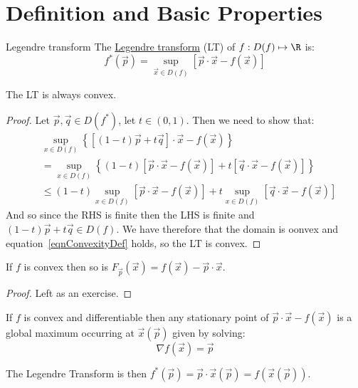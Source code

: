 \documentclass[../Main.tex]{subfiles}
\begin{document}
\section{Definition and Basic Properties}
\begin{definition}{Legendre transform}
    The \underline{Legendre transform} (LT) of $f : D(f) \mapsto \R$ is:
    \begin{equation}
        f^*(\vec{p}) = \sup_{\vec{x} \in D(f)} \left[\vec{p} \cdot \vec{x} - f(\vec{x})\right]
        \label{eqnLT}
    \end{equation}
\end{definition}
\begin{proposition}
    The LT is always convex.
    \label{propLTConvex}
\end{proposition}
\begin{proof}
    Let $\vec{p}, \vec{q} \in D(f^*)$, let $t \in (0, 1)$. Then we need to show that:
    \begin{align*}
        &\sup_{x \in D(f)} \left\{\left[(1 - t)\vec{p} + t\vec{q}\right] \cdot \vec{x} - f(\vec{x})\right\} \\
        &= \sup_{x \in D(f)} \left\{(1-t)\left[\vec{p} \cdot \vec{x} - f(\vec{x})\right] + t \left[\vec{q} \cdot \vec{x} - f(\vec{x})\right]\right\} \\
        &\leq (1-t) \sup_{x \in D(f)} \left[\vec{p} \cdot \vec{x} - f(\vec{x})\right] + t \sup_{x \in D(f)} \left[\vec{q} \cdot \vec{x} - f(\vec{x})\right]
    \end{align*}
    And so since the RHS is finite then the LHS is finite and $(1-t)\vec{p} + t\vec{q} \in D(f)$. We have therefore that the domain is oonvex and equation~\ref{eqnConvexityDef} holds, so the LT is convex.
\end{proof}
\begin{proposition}
    If $f$ is convex then so is $F_{\vec{p}}(\vec{x}) = f(\vec{x}) - \vec{p} \cdot \vec{x}$.
\end{proposition}
\begin{proof}
    Left as an exercise.
\end{proof}
\begin{corollary}
    If $f$ is convex and differentiable then any stationary point of $\vec{p} \cdot \vec{x} - f(\vec{x})$ is a global maximum occurring at $\vec{x}(\vec{p})$ given by solving:
    \begin{equation}
        \nabla f(\vec{x}) = \vec{p}
        \label{eqnLegendreMax}
    \end{equation}

    The Legendre Transform is then $f^*(\vec{p}) = \vec{p} \cdot \vec{x}(\vec{p}) = f(\vec{x}(\vec{p}))$.
\end{corollary}
\end{document}
